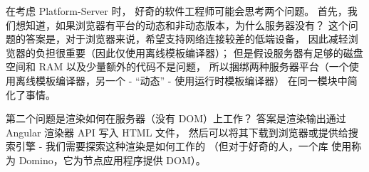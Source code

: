在考虑 Platform-Server 时，
好奇的软件工程师可能会思考两个问题。
首先，我们想知道，如果浏览器有平台的动态和非动态版本，为什么服务器没有？
这个问题的答案是，对于浏览器来说，希望支持网络连接较差的低端设备，
因此减轻浏览器的负担很重要（因此仅使用离线模板编译器）；
但是假设服务器有足够的磁盘空间和 RAM 以及少量额外的代码不是问题，
所以捆绑两种服务器平台（一个使用离线模板编译器，另一个 - “动态” - 使用运行时模板编译器）
在同一模块中简化了事情。


第二个问题是渲染如何在服务器（没有 DOM）上工作？
答案是渲染输出通过 Angular 渲染器 API 写入 HTML 文件，
然后可以将其下载到浏览器或提供给搜索引擎 - 我们需要探索这种渲染是如何工作的
（但对于好奇的人，一个库 使用称为 Domino，它为节点应用程序提供 DOM）。
